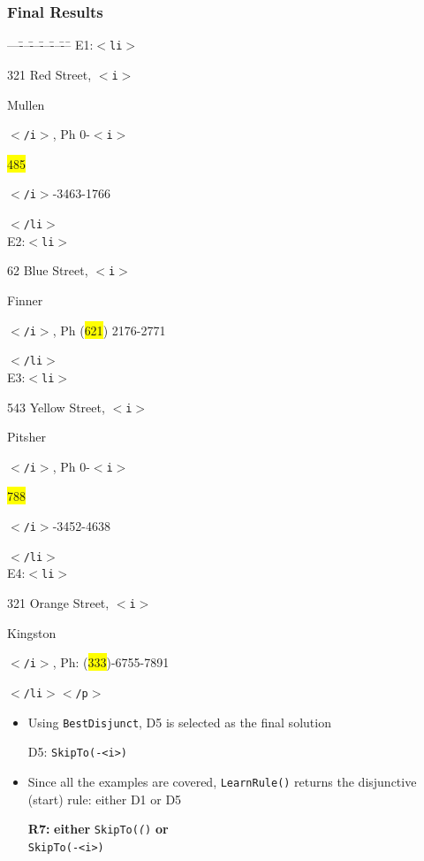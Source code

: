 \documentclass[svgnames]{beamer}
\newcounter{curtagcolor}
\newcommand{\xbtag}[1]{\textcolor{tagcolor!![\thecurtagcolor]}{$<$\texttt{#1}$>$}}
\newcommand{\xetag}[1]{\textcolor{tagcolor!![\thecurtagcolor]}{$<$\texttt{/#1}$>$}}
\newcommand{\xctag}[2]{\xbtag{#1}\addtocounter{curtagcolor}{1}#2\addtocounter{curtagcolor}{-1}\xetag{#1}}
\newenvironment{xml}{
  \begin{minipage}{.6\textwidth}
    \begin{tabbing}
      ---\=---\=---\=---\=---\=---\=\kill}{   
    \end{tabbing}
  \end{minipage}
}
\begin{document}



\begin{frame} \frametitle{Final Results}
  
  \begin{exampleblock}{}
    \centering \scriptsize
    \begin{xml}
      E1:\xctag{li}{321 Red Street, \xctag{i}{Mullen}, Ph
        0-\xctag{i}{\colorbox{yellow}{485}}-3463-1766} \\
      E2:\xctag{li}{62 Blue Street, \xctag{i}{Finner}, Ph
        (\colorbox{yellow}{621}) 2176-2771} \\
      E3:\xctag{li}{543 Yellow Street, \xctag{i}{Pitsher}, Ph
        0-\xctag{i}{\colorbox{yellow}{788}}-3452-4638} \\
      E4:\xctag{li}{321 Orange Street, \xctag{i}{Kingston}, Ph:
        (\colorbox{yellow}{333})-6755-7891}\xetag{p}
    \end{xml}
  \end{exampleblock}

  \begin{itemize}
  \item Using \texttt{BestDisjunct}, D5 is selected as the final solution
    \begin{center}
      D5: \texttt{SkipTo(-<i>)}
    \end{center}
  \item Since all the examples are covered, \texttt{LearnRule()} returns the
    disjunctive (start) rule: either D1 or D5
    \begin{center}
      \textbf{R7:} \textbf{either} \texttt{SkipTo(\textit{(})} \textbf{or} \\
      \texttt{SkipTo(-<i>)}
    \end{center}
  \end{itemize}

\end{frame}


  
\end{document}
